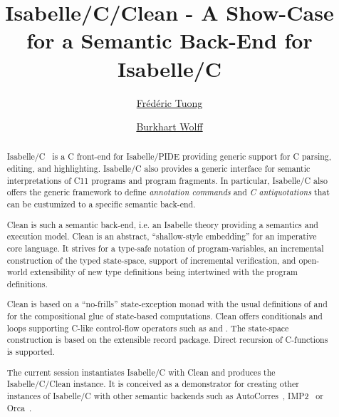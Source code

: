 \documentclass[fontsize=11pt,paper=a4,open=right,twoside,abstract=true]{scrreprt}
\begin{document}
\title{Isabelle/C/Clean - A Show-Case for a Semantic Back-End for Isabelle/C}
\author{%
  \href{https://www.lri.fr/~ftuong/}{Fr\'ed\'eric Tuong}
  \and
  \href{https://www.lri.fr/~wolff/}{Burkhart Wolff}}
\publishers{%
  \mbox{LRI, Univ. Paris-Sud, CNRS, Universit\'e Paris-Saclay} \\
  b\^at. 650 Ada Lovelace, 91405 Orsay, France \texorpdfstring{\\}{}
}

\maketitle

\begin{abstract}
Isabelle/C~\cite{Tuong-IsabelleC:2019} is a C front-end for Isabelle/PIDE
providing generic support for C parsing, editing, and highlighting. Isabelle/C
also provides a generic interface for semantic interpretations of C11 programs
and program fragments. In particular, Isabelle/C also offers the generic
framework to define \emph{annotation commands} and \emph{C antiquotations} that
can be custumized to a specific semantic back-end.

Clean is such a semantic back-end, i.e. an Isabelle theory providing a
semantics and execution model. Clean is an abstract, ``shallow-style
embedding'' for an imperative core language. It strives for a type-safe
notation of program-variables, an incremental construction of the typed
state-space, support of incremental verification, and open-world extensibility
of new type definitions being intertwined with the program definitions.

Clean is based on a ``no-frills'' state-exception monad with the usual
definitions of  and  for the compositional glue of
state-based computations.  Clean offers conditionals and loops supporting
C-like control-flow operators such as  and . The
state-space construction is based on the extensible record package. Direct
recursion of C-functions is supported.

The current session instantiates Isabelle/C with Clean and produces the
Isabelle/C/Clean instance. It is conceived as a demonstrator for creating other
instances of Isabelle/C with other semantic backends such as
AutoCorres~\cite{DBLP:conf/pldi/GreenawayLAK14},
IMP2~\cite{DBLP:journals/afp/LammichW19} or Orca~\cite{bockenek:hal-02069705}.
\end{abstract}

\newpage
\tableofcontents
\end{document}
